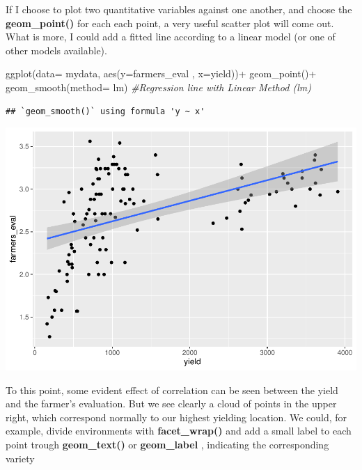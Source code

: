 \documentclass[
]{book}
\newenvironment{Shaded}{\begin{snugshade}}{\end{snugshade}}
\newcommand{\AttributeTok}[1]{\textcolor[rgb]{0.77,0.63,0.00}{#1}}
\newcommand{\CommentTok}[1]{\textcolor[rgb]{0.56,0.35,0.01}{\textit{#1}}}
\newcommand{\FunctionTok}[1]{\textcolor[rgb]{0.00,0.00,0.00}{#1}}
\newcommand{\NormalTok}[1]{#1}
\newcommand{\SpecialCharTok}[1]{\textcolor[rgb]{0.00,0.00,0.00}{#1}}
\begin{document}
If I choose to plot two quantitative variables against one another, and choose the \textbf{geom\_point() } for each each point, a very useful scatter plot will come out. What is more, I could add a fitted line according to a linear model (or one of other models available).

\begin{Shaded}
\begin{Highlighting}[]
\FunctionTok{ggplot}\NormalTok{(}\AttributeTok{data=}\NormalTok{ mydata, }\FunctionTok{aes}\NormalTok{(}\AttributeTok{y=}\NormalTok{farmers\_eval ,  }\AttributeTok{x=}\NormalTok{yield))}\SpecialCharTok{+}
                   \FunctionTok{geom\_point}\NormalTok{()}\SpecialCharTok{+}
                   \FunctionTok{geom\_smooth}\NormalTok{(}\AttributeTok{method=}\NormalTok{ lm) }\CommentTok{\#Regression line with Linear Method (lm)}
\end{Highlighting}
\end{Shaded}

\begin{verbatim}
## `geom_smooth()` using formula 'y ~ x'
\end{verbatim}

\includegraphics{PPB-Toolkit-for-R-and-R-Studio_files/figure-latex/unnamed-chunk-64-1.pdf}

To this point, some evident effect of correlation can be seen between the yield and the farmer's evaluation. But we see clearly a cloud of points in the upper right, which correspond normally to our highest yielding location. We could, for example, divide environments with \textbf{facet\_wrap() } and add a small label to each point trough \textbf{geom\_text() } or \textbf{geom\_label} , indicating the corresponding variety
\end{document}
